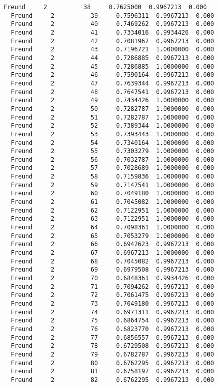 \documentclass[11pt]{article}
\begin{document}
\begin{Verbatim}[commandchars=\\\{\}]
  Freund     2          38     0.7625000  0.9967213  0.000
  Freund     2          39     0.7596311  0.9967213  0.000
  Freund     2          40     0.7469262  0.9967213  0.000
  Freund     2          41     0.7334016  0.9934426  0.000
  Freund     2          42     0.7081967  0.9967213  0.000
  Freund     2          43     0.7196721  1.0000000  0.000
  Freund     2          44     0.7286885  0.9967213  0.000
  Freund     2          45     0.7286885  1.0000000  0.000
  Freund     2          46     0.7590164  0.9967213  0.000
  Freund     2          47     0.7639344  0.9967213  0.000
  Freund     2          48     0.7647541  0.9967213  0.000
  Freund     2          49     0.7434426  1.0000000  0.000
  Freund     2          50     0.7282787  1.0000000  0.000
  Freund     2          51     0.7282787  1.0000000  0.000
  Freund     2          52     0.7389344  1.0000000  0.000
  Freund     2          53     0.7393443  1.0000000  0.000
  Freund     2          54     0.7340164  1.0000000  0.000
  Freund     2          55     0.7303279  1.0000000  0.000
  Freund     2          56     0.7032787  1.0000000  0.000
  Freund     2          57     0.7028689  1.0000000  0.000
  Freund     2          58     0.7159836  1.0000000  0.000
  Freund     2          59     0.7147541  1.0000000  0.000
  Freund     2          60     0.7049180  1.0000000  0.000
  Freund     2          61     0.7045082  1.0000000  0.000
  Freund     2          62     0.7122951  1.0000000  0.000
  Freund     2          63     0.7122951  1.0000000  0.000
  Freund     2          64     0.7098361  1.0000000  0.000
  Freund     2          65     0.7053279  1.0000000  0.000
  Freund     2          66     0.6942623  0.9967213  0.000
  Freund     2          67     0.6967213  1.0000000  0.000
  Freund     2          68     0.7045082  0.9967213  0.000
  Freund     2          69     0.6979508  0.9967213  0.000
  Freund     2          70     0.6848361  0.9934426  0.000
  Freund     2          71     0.7094262  0.9967213  0.000
  Freund     2          72     0.7061475  0.9967213  0.000
  Freund     2          73     0.7049180  0.9967213  0.000
  Freund     2          74     0.6971311  0.9967213  0.000
  Freund     2          75     0.6864754  0.9967213  0.000
  Freund     2          76     0.6823770  0.9967213  0.000
  Freund     2          77     0.6856557  0.9967213  0.000
  Freund     2          78     0.6729508  0.9967213  0.000
  Freund     2          79     0.6782787  0.9967213  0.000
  Freund     2          80     0.6762295  0.9967213  0.000
  Freund     2          81     0.6758197  0.9967213  0.000
  Freund     2          82     0.6762295  0.9967213  0.000

\end{Verbatim}
\end{document}
